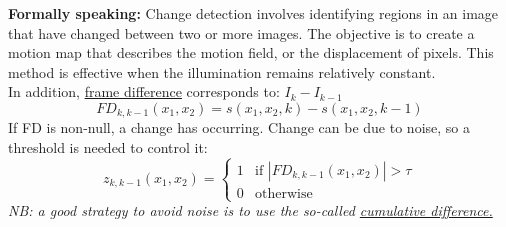 \textbf{Formally speaking:}
Change detection involves identifying regions in an image that have changed between two or more images. 
The objective is to create a motion map that describes the motion field, or the displacement of pixels. 
This method is effective when the illumination remains relatively constant.
\\In addition, \underline{frame difference} corresponds to: $I_k - I_{k-1}$
\[
    FD_{k, k-1}(x_1, x_2)= s(x_1, x_2, k)-s(x_1, x_2, k-1)
\]
If FD is non-null, a change has occurring. Change can be due to noise, so a threshold is needed to control it:
\[
    z_{k, k-1}(x_1, x_2)= \begin{cases} 1 & \text{if } |FD_{k, k-1}(x_1, x_2)| > \tau \\ 0 & \text{otherwise} \end{cases}
\]
\textit{NB: a good strategy to avoid noise is to use the so-called \underline{cumulative difference.}}
